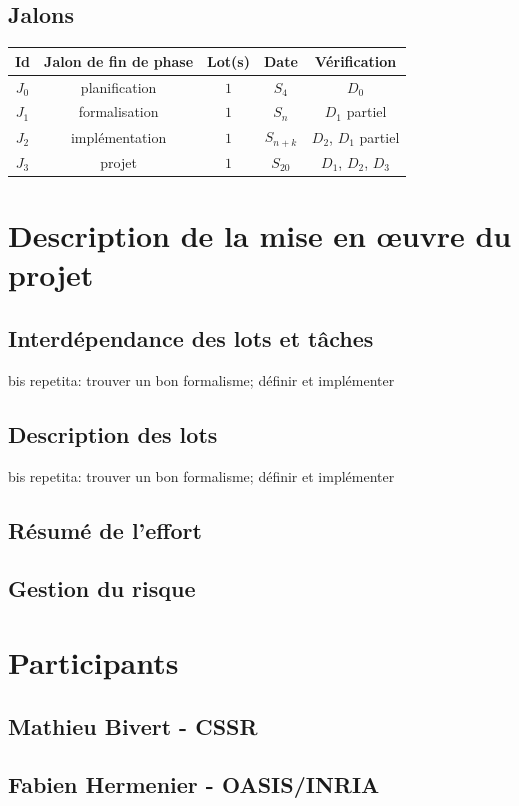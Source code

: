 \documentclass[a4paper]{article}
\begin{document}
\subsection{Jalons}
\begin{table}
\centering
\begin{tabular}{c|c|c|c|c}
	Id & Jalon de fin de phase & Lot(s) & Date & Vérification \\
	\hline
	\hline
	$J_0$ & planification & $1$ & $S_4$ & $D_0$ \\
	\hline
	$J_1$ & formalisation & $1$ & $S_n$ & $D_1$ partiel \\
	\hline
	$J_2$ & implémentation & $1$ & $S_{n+k}$ & $D_2$, $D_1$ partiel \\
	\hline
	$J_3$ & projet & $1$ & $S_{20}$ & $D_1$, $D_2$, $D_3$ \\
\end{tabular}
\end{table}

\section{Description de la mise en œuvre du projet}
\subsection{Interdépendance des lots et tâches}
bis repetita: trouver un bon formalisme; définir et implémenter
\subsection{Description des lots}
bis repetita: trouver un bon formalisme; définir et implémenter
\subsection{Résumé de l'effort}
\subsection{Gestion du risque}

\section{Participants}
\subsection{Mathieu Bivert - CSSR}
\subsection{Fabien Hermenier - OASIS/INRIA}

\newpage
{}


\end{document}
